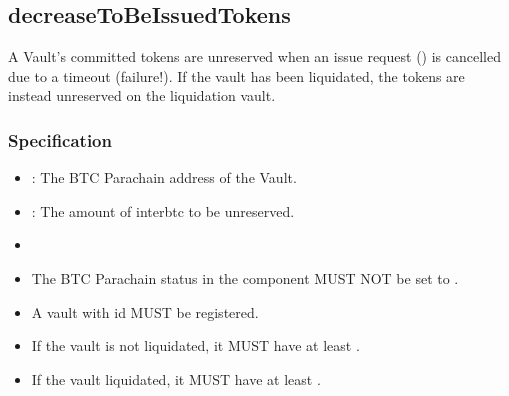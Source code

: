 \documentclass[a4paper,10pt,english]{sphinxmanual}
\begin{document}
\subsection{decreaseToBeIssuedTokens}
\label{\detokenize{spec/vault-registry:decreasetobeissuedtokens}}\label{\detokenize{spec/vault-registry:id15}}
A Vault’s committed tokens are unreserved when an issue request ({\hyperref[\detokenize{spec/issue:cancelissue}]{}}) is cancelled due to a timeout (failure!). If the vault has been liquidated, the tokens are instead unreserved on the liquidation vault.


\subsubsection{Specification}
\label{\detokenize{spec/vault-registry:id16}}


\begin{itemize}
\item {} 
: The BTC Parachain address of the Vault.

\item {} 
: The amount of interbtc to be unreserved.

\end{itemize}

\begin{itemize}
\item {} 

\end{itemize}

\begin{itemize}
\item {} 
The BTC Parachain status in the {\hyperref[\detokenize{spec/security:security}]{}} component MUST NOT be set to .

\item {} 
A vault with id  MUST be registered.

\item {} 
If the vault is not liquidated, it MUST have at least  .

\item {} 
If the vault  liquidated, it MUST have at least  .

\end{itemize}
\end{document}

